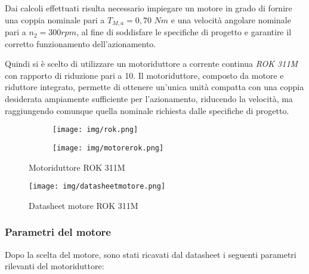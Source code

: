 \documentclass{article}
\begin{document}
\vspace{0.3cm}
Dai calcoli effettuati risulta necessario impiegare un motore in grado di fornire una coppia nominale pari a $T_{M,a}= 0,70 $ $Nm$ e una velocità angolare nominale pari a $n_2= 300 rpm$, al fine di soddisfare le specifiche di progetto e garantire il corretto funzionamento dell’azionamento.

Quindi si è scelto di utilizzare un motoriduttore a corrente continua \textit{ROK 311M} con rapporto di riduzione pari a 10. Il motoriduttore, composto da motore e riduttore integrato, permette di ottenere un'unica unità compatta con una coppia desiderata ampiamente sufficiente per l'azionamento, riducendo la velocità,  ma raggiungendo comunque quella nominale richiesta dalle specifiche di progetto. 

\begin{figure}[h!]
    \centering
    \begin{subfigure}{0.48\textwidth}
        \centering
        \texttt{[image: img/rok.png]}
        \label{fig:rok1}
    \end{subfigure}
    \hfill
    \begin{subfigure}{0.38\textwidth}
        \centering
        \texttt{[image: img/motorerok.png]}
        \label{fig:rok2}
    \end{subfigure}
    \caption{Motoriduttore ROK 311M}
    \label{fig:rok_motore}
\end{figure}
\begin{figure}
    \centering
    \texttt{[image: img/datasheetmotore.png]}
    \caption{Datasheet motore ROK 311M}
    \label{fig:datasheetmotore}
\end{figure}
\pagebreak

\subsubsection{Parametri del motore}
Dopo la scelta del motore, sono stati ricavati dal datasheet i seguenti parametri rilevanti del motoriduttore:
\end{document}
